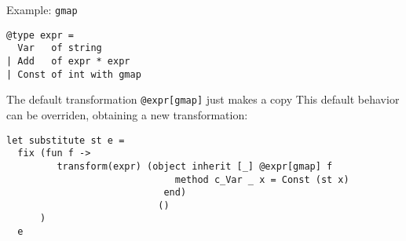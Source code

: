 \documentclass{beamer}
\theoremstyle{definition}
\theoremstyle{plain} %
\begin{document}

\begin{comment}
  Now we consider a number of examples; we concentrate on the cases which makes use of the object-oriented layer of the
  framework.

  The first example is connected with the utilization of the tranformation \lstinline|map|; in our case it is implemented
  by a plugin \lstinline|gmap|. Here we used a \lstinline|camlp5| syntax extension: \lstinline|@type| makes the type definition
  visible for the framework, and \lstinline|with gmap| additionally asks to generate the implementation for the corresponding
  plugin. The construct \lstinline|@expr[gmap]| is expanded into a class name for the generated transformation. For the shown type,
  this plugin generates no more than a copy transformation (indeed, the type is not polymorphic). 
  However, we can make use of this transformation, since we can inherit from it and modify its behaviour only for an ``interesting''
  case. We implemented here a transformation, which substitutes all variables in an expresion tree by their values in given
  state \lstinline|st| (we used here an immediate object). This example shows, that with object-oriented approach we can make a good
  use of seemingly useless transformations by reusing a part of their semantics.
\end{comment}

\begin{frame}[fragile]{Example: \lstinline[basicstyle=\Large]|gmap|}

\begin{lstlisting}
@type expr =
  Var   of string
| Add   of expr * expr
| Const of int with gmap
\end{lstlisting}
\vskip5mm

The default transformation \lstinline[basicstyle=\large]|@expr[gmap]| just makes a copy
\vskip5mm
This default behavior can be overriden, obtaining a new transformation:
\vskip5mm

\begin{lstlisting}
let substitute st e =
  fix (fun f ->
         transform(expr) (object inherit [_] @expr[gmap] f
                              method c_Var _ x = Const (st x)
                            end)
                           ()
      )
  e                            
\end{lstlisting}

\end{frame}
\end{document}
